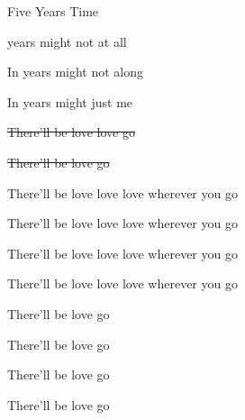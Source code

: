 \begin{SBSong}{Five Years Time}
\begin{SBChorus}
     years   might not  at all
    
    In  years   might not  along

    In  years   might just  me 
  \end{SBChorus}
  \begin{SBVerse*}
    
    \sout{There'll be love love    go}
    
    \sout{There'll be  love    go} 
  \end{SBVerse*}
  \begin{SBVerse}
    There'll be love love love wherever you go
  
    There'll be love love love wherever you go
  
    There'll be love love love wherever you go
  
    There'll be love love love wherever you go
  \end{SBVerse}
  \begin{SBVerse}
    There'll be  love    go
  
    There'll be  love    go
  
    There'll be  love    go
  
    There'll be  love    go
  \end{SBVerse}
\end{SBSong}
